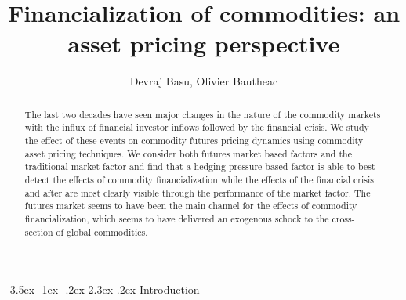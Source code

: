 \documentclass[11pt, letterpaper, doublespacing]{article}
\title{Financialization of commodities: an asset pricing perspective}
\author{Devraj Basu, Olivier Bautheac}
\date{}
\makeatletter
\renewcommand{\section}{\@startsection {section}{1}{\z@}%
  {-3.5ex \@plus -1ex \@minus -.2ex}%
  {2.3ex \@plus.2ex}%
  {\centering\normalfont\large\bfseries}}
\makeatother
\begin{document}
\maketitle
\begin{abstract}
The last two decades have seen major changes in the nature of the
commodity markets with the influx of financial investor inflows followed
by the financial crisis. We study the effect of these events on
commodity futures pricing dynamics using commodity asset pricing
techniques. We consider both futures market based factors and the
traditional market factor and find that a hedging pressure based factor
is able to best detect the effects of commodity financialization while
the effects of the financial crisis and after are most clearly visible
through the performance of the market factor. The futures market seems
to have been the main channel for the effects of commodity
financialization, which seems to have delivered an exogenous schock to
the cross-section of global commodities.
\end{abstract}

\newpage

\section{Introduction}\label{introduction}
\end{document}
